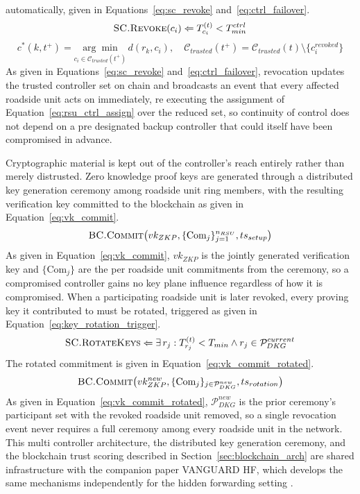 \documentclass[final,5p,twocolumn]{elsarticle}
\theoremstyle{remark}
\theoremstyle{plain}
\begin{document}
automatically, given in Equations~\eqref{eq:sc_revoke}
and~\eqref{eq:ctrl_failover}.
\begin{equation}
	\textsc{SC.Revoke}(c_i) \Leftarrow T_{c_i}^{(t)} < T_{min}^{ctrl}
	\label{eq:sc_revoke}
\end{equation}
\begin{equation}
	c^*(k, t^+) = \underset{c_i \in \mathcal{C}_{trusted}(t^+)}{\arg\min}\, d(r_k, c_i), \quad \mathcal{C}_{trusted}(t^+) = \mathcal{C}_{trusted}(t) \setminus \{c_i^{revoked}\}
	\label{eq:ctrl_failover}
\end{equation}
As given in Equations~\eqref{eq:sc_revoke} and~\eqref{eq:ctrl_failover},
revocation updates the trusted controller set on chain and broadcasts an
event that every affected roadside unit acts on immediately, re executing
the assignment of Equation~\eqref{eq:rsu_ctrl_assign} over the reduced set,
so continuity of control does not depend on a pre designated backup
controller that could itself have been compromised in advance.

Cryptographic material is kept out of the controller's reach entirely rather
than merely distrusted. Zero knowledge proof keys are generated through a
distributed key generation ceremony among roadside unit ring members, with
the resulting verification key committed to the blockchain as given in
Equation~\eqref{eq:vk_commit}.
\begin{equation}
	\textsc{BC.Commit}\!\left(vk_{ZKP}, \{\text{Com}_j\}_{j=1}^{n_{RSU}}, ts_{setup}\right)
	\label{eq:vk_commit}
\end{equation}
As given in Equation~\eqref{eq:vk_commit}, $vk_{ZKP}$ is the jointly
generated verification key and $\{\text{Com}_j\}$ are the per roadside unit
commitments from the ceremony, so a compromised controller gains no
key plane influence regardless of how it is compromised. When a
participating roadside unit is later revoked, every proving key it
contributed to must be rotated, triggered as given in
Equation~\eqref{eq:key_rotation_trigger}.
\begin{equation}
	\textsc{SC.RotateKeys} \Leftarrow \exists\, r_j : T_{r_j}^{(t)} < T_{min} \land r_j \in \mathcal{P}_{DKG}^{current}
	\label{eq:key_rotation_trigger}
\end{equation}
The rotated commitment is given in Equation~\eqref{eq:vk_commit_rotated}.
\begin{equation}
	\textsc{BC.Commit}\!\left(vk_{ZKP}^{new}, \{\text{Com}_j\}_{j \in \mathcal{P}_{DKG}^{new}}, ts_{rotation}\right)
	\label{eq:vk_commit_rotated}
\end{equation}
As given in Equation~\eqref{eq:vk_commit_rotated}, $\mathcal{P}_{DKG}^{new}$
is the prior ceremony's participant set with the revoked roadside unit
removed, so a single revocation event never requires a full ceremony among
every roadside unit in the network. This multi controller architecture, the
distributed key generation ceremony, and the blockchain trust scoring
described in Section~\ref{sec:blockchain_arch} are shared infrastructure with
the companion paper VANGUARD HF, which develops the same mechanisms
independently for the hidden forwarding setting \cite{VanguardHF2026}.
\end{document}
